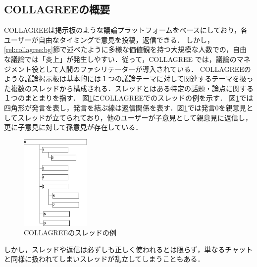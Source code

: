 \subsection{COLLAGREEの概要}
COLLAGREEは掲示板のような議論プラットフォームをベースにしており，各ユーザーが自由なタイミングで意見を投稿，返信できる．
しかし，\ref{rel:collagree:bg}節で述べたように多様な価値観を持つ大規模な人数での，自由な議論では「炎上」が発生しやすい．従って，COLLAGREE では，議論のマネジメント役として人間のファシリテーターが導入されている．
COLLAGREEのような議論掲示板は基本的には１つの議論テーマに対して関連するテーマを扱った複数のスレッドから構成される．スレッドとはある特定の話題・論点に関する１つのまとまりを指す．
図\ref{Fig:thread1}にCOLLAGREEでのスレッドの例を示す．
図\ref{Fig:thread1}では四角形が発言を表し，発言を結ぶ線は返信関係を表す．図\ref{Fig:thread1}では発言$0$を親意見としてスレッドが立てられており，他のユーザーが子意見として親意見に返信し，更に子意見に対して孫意見が存在している．
\begin{figure}[htbp]
 \begin{center}
  \includegraphics[width=0.3\textwidth]{../images/2.Related_Work/COLLAGREE_thread.png}
  \caption{COLLAGREEのスレッドの例}
  \label{Fig:thread1}
  \vspace{-10pt}
 \end{center}
\end{figure}

しかし，スレッドや返信は必ずしも正しく使われるとは限らず，単なるチャットと同様に扱われてしまいスレッドが乱立してしまうこともある．%

